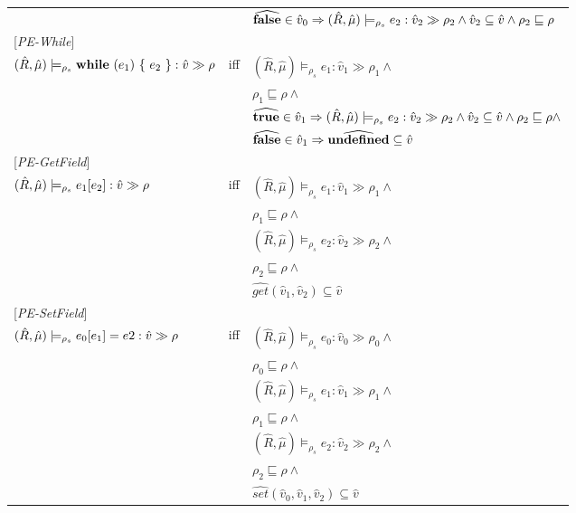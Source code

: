 \documentclass[[12pt,a4paper,twoside,openrigh]{article}
\newcommand{\vat}[0]{\hat{v}}
\newcommand{\muat}[0]{\hat{\mu}}
\newcommand{\Rat}[0]{\hat{R}}
\newcommand{\modelrho}{\models_{\rho_s}}
\newcommand{\aenvs}{(\Rat,\muat)}
\newcommand{\caesti}[2]{\aenvs \modelrho #1 : \vat_{#2} \gg \rho_{#2}}
\newcommand{\caest}[1]{\aenvs \modelrho #1 : \vat \gg \rho}
\begin{document}
\begin{tabular}{l l l}
&& $\widehat{\false} \in \vat_0 \Rightarrow \caesti {e_2} {2} \wedge \vat_2 \subseteq \vat \wedge \rho_2 \sqsubseteq \rho$ \\
{[\textit{PE-While}]}\\
$\caest {\while {e_1} {e_2}} $& iff &$ \caesti {e_1} {1} \wedge $\\
&& $\rho_1 \sqsubseteq \rho \wedge$ \\
&& $\widehat{\true} \in \vat_1 \Rightarrow \caesti {e_2} {2} \wedge \vat_2 \subseteq \vat \wedge \rho_2 \sqsubseteq \rho \wedge$\\
&& $\widehat{\false} \in \vat_1 \Rightarrow \widehat{\undef} \subseteq \vat$\\
{[\textit{PE-GetField}]}\\
$\caest {\lookup {e_1} {e_2}} $& iff &$ \caesti {e_1} {1} \wedge $\\
&& $\rho_1 \sqsubseteq \rho \wedge$ \\
&& $ \caesti {e_2} {2} \wedge $ \\
&& $\rho_2 \sqsubseteq \rho \wedge$ \\
&& $\widehat{get} (\vat_1, \vat_2) \subseteq \vat$ \\
{[\textit{PE-SetField}]}\\
$\caest {\store {e_0} {e_1} {e2}} $& iff &$ \caesti {e_0} {0} \wedge $\\
&& $\rho_0 \sqsubseteq \rho \wedge$ \\
&& $ \caesti {e_1} {1} \wedge $ \\
&& $\rho_1 \sqsubseteq \rho \wedge$ \\
&& $ \caesti {e_2} {2} \wedge $ \\
&& $\rho_2 \sqsubseteq \rho \wedge$ \\
&& $\widehat{set} (\vat_0, \vat_1, \vat_2) \subseteq \vat$ \\
\end{tabular}
\end{document}
